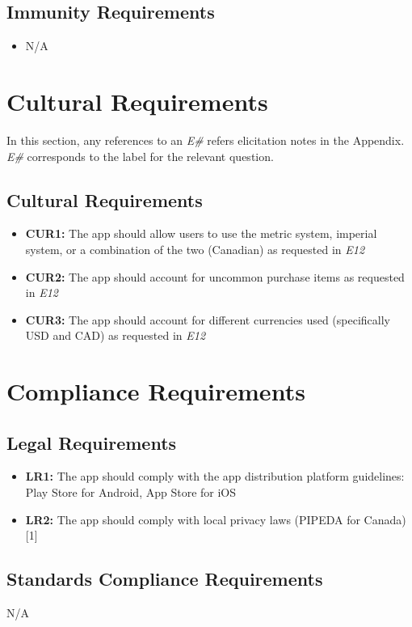 \documentclass[12pt]{article}
\begin{document}
\subsection{Immunity Requirements}
\begin{itemize}
    \item N/A
\end{itemize}

\section{Cultural Requirements}
In this section, any references to an \textit{E\#} refers elicitation notes in the Appendix. \textit{E\#} corresponds to the label for the relevant question.
\subsection{Cultural Requirements}
\begin{itemize}
    \item \textbf{CUR1:} The app should allow users to use the metric system, imperial system, or a combination of the two (Canadian) as requested in \textit{E12}
    \item \textbf{CUR2:} The app should account for uncommon purchase items as requested in \textit{E12}
    \item \textbf{CUR3:} The app should account for different currencies used (specifically USD and CAD) as requested in \textit{E12}
\end{itemize}

\section{Compliance Requirements}
\subsection{Legal Requirements}
\begin{itemize}
    \item \textbf{LR1:} The app should comply with the app distribution platform guidelines: Play Store for Android, App Store for iOS
    \item \textbf{LR2:} The app should comply with local privacy laws (PIPEDA for Canada) [1]
\end{itemize}
\subsection{Standards Compliance Requirements}
N/A
\end{document}
